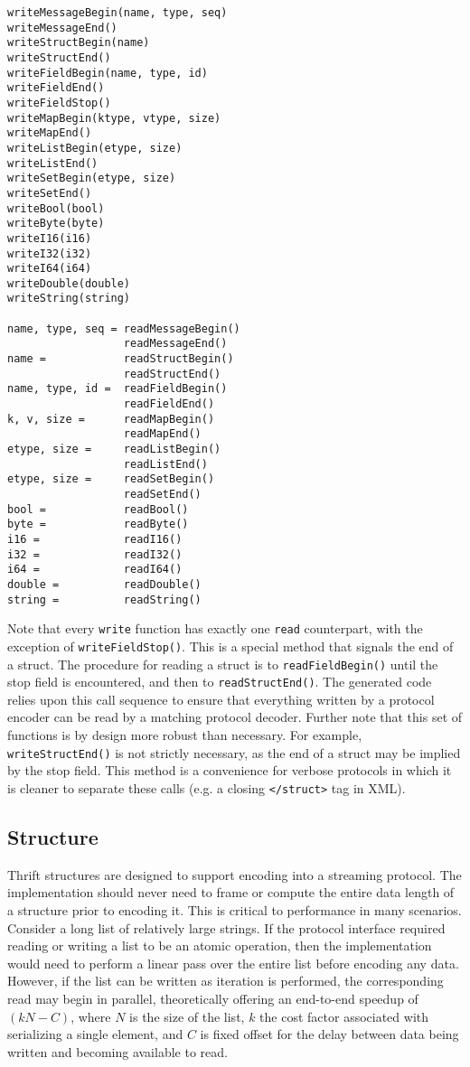\documentclass[nocopyrightspace,blockstyle]{sigplanconf}
\begin{document}
\begin{verbatim}
writeMessageBegin(name, type, seq)
writeMessageEnd()
writeStructBegin(name)
writeStructEnd()
writeFieldBegin(name, type, id)
writeFieldEnd()
writeFieldStop()
writeMapBegin(ktype, vtype, size)
writeMapEnd()
writeListBegin(etype, size)
writeListEnd()
writeSetBegin(etype, size)
writeSetEnd()
writeBool(bool)
writeByte(byte)
writeI16(i16)
writeI32(i32)
writeI64(i64)
writeDouble(double)
writeString(string)

name, type, seq = readMessageBegin()
                  readMessageEnd()
name =            readStructBegin()
                  readStructEnd()
name, type, id =  readFieldBegin()
                  readFieldEnd()
k, v, size =      readMapBegin()
                  readMapEnd()
etype, size =     readListBegin()
                  readListEnd()
etype, size =     readSetBegin()
                  readSetEnd()
bool =            readBool()
byte =            readByte()
i16 =             readI16()
i32 =             readI32()
i64 =             readI64()
double =          readDouble()
string =          readString()
\end{verbatim}

Note that every \texttt{write} function has exactly one \texttt{read} counterpart, with
the exception of \texttt{writeFieldStop()}. This is a special method
that signals the end of a struct. The procedure for reading a struct is to
\texttt{readFieldBegin()} until the stop field is encountered, and then to
\texttt{readStructEnd()}.  The
generated code relies upon this call sequence to ensure that everything written by
a protocol encoder can be read by a matching protocol decoder. Further note
that this set of functions is by design more robust than necessary.
For example, \texttt{writeStructEnd()} is not strictly necessary, as the end of
a struct may be implied by the stop field. This method is a convenience for
verbose protocols in which it is cleaner to separate these calls (e.g. a closing
\texttt{</struct>} tag in XML).

\subsection{Structure}

Thrift structures are designed to support encoding into a streaming
protocol. The implementation should never need to frame or compute the
entire data length of a structure prior to encoding it. This is critical to
performance in many scenarios. Consider a long list of relatively large
strings. If the protocol interface required reading or writing a list to be an
atomic operation, then the implementation would need to perform a linear pass over the
entire list before encoding any data. However, if the list can be written
as iteration is performed, the corresponding read may begin in parallel,
theoretically offering an end-to-end speedup of $(kN - C)$, where $N$ is the size
of the list, $k$ the cost factor associated with serializing a single
element, and $C$ is fixed offset for the delay between data being written
and becoming available to read.
\end{document}
